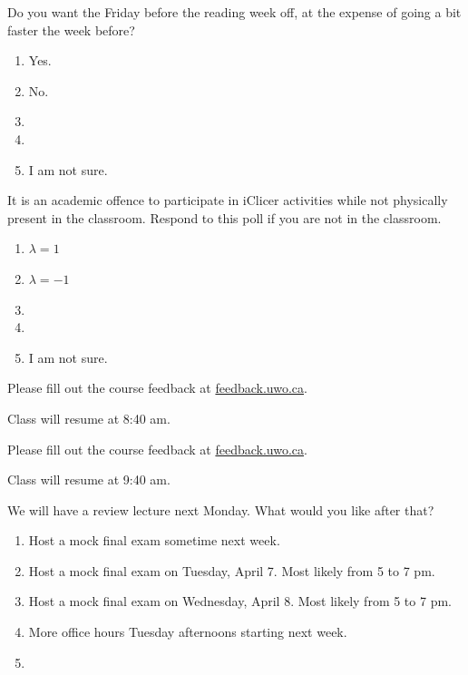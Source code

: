 \documentclass[aspectratio=169, t, 14pt]{beamer}
\begin{document}
\begin{poll}
  Do you want the Friday before the reading week off, at the expense of going a bit faster the week before?

  \begin{enumerate}
    \item Yes.
    \item No.
    \item 
    \item 
    \item I am not sure.
  \end{enumerate}
\end{poll}

\begin{poll}
  It is an academic offence to participate in iClicer activities while not physically present in the classroom. Respond to this poll if you are not in the classroom.

\begin{enumerate}
    \item \(\lambda = 1\)
    \item \(\lambda = -1\)
    \item 
    \item 
    \item I am not sure.
  \end{enumerate}
\end{poll}

\begin{frame}[c]
  Please fill out the course feedback at \url{feedback.uwo.ca}. 

  \begin{center}
  \end{center}

  Class will resume at 8:40 am.
\end{frame}

\begin{frame}[c]
  Please fill out the course feedback at \url{feedback.uwo.ca}. 

  \begin{center}
  \end{center}

  Class will resume at 9:40 am.
\end{frame}

\begin{poll}[c]
  We will have a review lecture next Monday.  What would you like after that?

  \begin{enumerate}
    \item Host a mock final exam sometime next week.
    \item Host a mock final exam on Tuesday, April 7.  Most likely from 5 to 7 pm.
    \item Host a mock final exam on Wednesday, April 8. Most likely from 5 to 7 pm.
    \item More office hours Tuesday afternoons starting next week.
    \item 
  \end{enumerate}
\end{poll}
\end{document}

